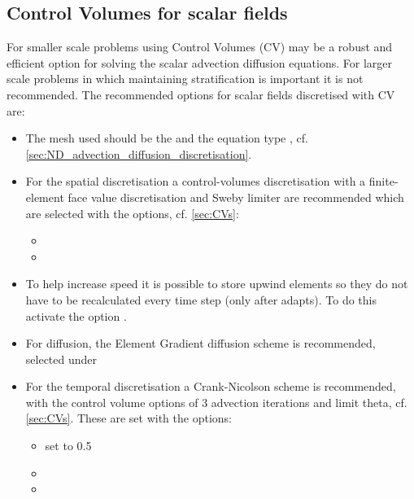 \subsection{Control Volumes for scalar fields}
For smaller scale problems using Control Volumes (CV) may be a robust and efficient
option for solving the scalar advection diffusion equations. For larger scale problems in which maintaining stratification is
important it is not recommended. The recommended options for scalar fields
discretised with CV are:
\begin{itemize}
  \item The mesh used should be the  and the equation type , cf. \ref{sec:ND_advection_diffusion_discretisation}.
  \item For the spatial discretisation a control-volumes discretisation with a finite-element face value discretisation and Sweby limiter are recommended which are selected with the options, cf. \ref{sec:CVs}:
\begin{itemize}
\item {}
\item {}
\end{itemize}
\item To help increase speed it is possible to store upwind elements so they do
  not have to be recalculated every time step (only after adapts). To do this
  activate the option
.
\item For diffusion, the Element Gradient diffusion scheme is recommended, selected under 
\item For the temporal discretisation a Crank-Nicolson scheme is recommended, with the control volume options of 3 advection iterations and limit theta, cf. \ref{sec:CVs}. These are set with the options:
\begin{itemize}
\item{ set to 0.5}
\item{}
\item{}
\end{itemize}
\end{itemize}

